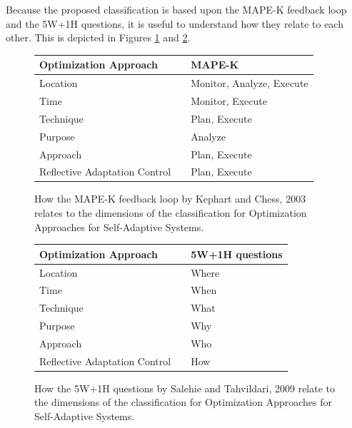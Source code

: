 \newpage

Because the proposed classification is based upon the MAPE-K feedback loop and the 5W+1H questions,
it is useful to understand how they relate to each other.
This is depicted in Figures \ref{fig:MapeOA} and \ref{fig:QuestionsOA}.

\begin{figure}[h]
    \centering
    \begin{tabular}{|lcl|}
        \hline
        Optimization Approach & & MAPE-K \\
        \hline
        Location & & Monitor, Analyze, Execute \\
        \hline
        Time & & Monitor, Execute \\
        \hline
        Technique & & Plan, Execute \\
        \hline
        Purpose & & Analyze \\
        \hline
        Approach & & Plan, Execute \\
        \hline
        Reflective Adaptation Control & & Plan, Execute \\
        \hline
    \end{tabular}
    \caption{How the MAPE-K feedback loop by Kephart and Chess, 2003\cite*{VisionOfAutonomicComputing}
    relates to the dimensions of the classification for Optimization Approaches for Self-Adaptive Systems.}
    \label{fig:MapeOA}
\end{figure}

\begin{figure}[h]
    \centering
    \begin{tabular}{|lcl|}
        \hline
        Optimization Approach & & 5W+1H questions \\
        \hline
        Location & & Where \\
        \hline
        Time & & When \\
        \hline
        Technique & & What \\
        \hline
        Purpose & & Why \\
        \hline
        Approach & & Who \\
        \hline
        Reflective Adaptation Control & & How \\
        \hline
    \end{tabular}
    \caption{How the 5W+1H questions by Salehie and Tahvildari, 2009 \cite*{LandscapeAndResearchChallenges}
    relate to the dimensions of the classification for Optimization Approaches for Self-Adaptive Systems.}
    \label{fig:QuestionsOA}
\end{figure}
